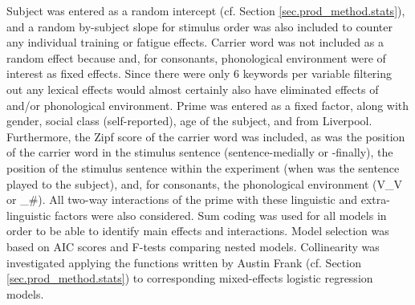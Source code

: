 Subject was entered as a random intercept (cf. Section \ref{sec.prod_method.stats}), and a random by-subject slope for stimulus order was also included to counter any individual training or fatigue effects.
Carrier word was not included as a random effect because  and, for consonants, phonological environment were of interest as fixed effects.
Since there were only 6 keywords per variable filtering out any lexical effects would almost certainly also have eliminated effects of  and/or phonological environment.
Prime was entered as a fixed factor, along with gender, social class (self-reported), age of the subject, and  from Liverpool.
Furthermore, the Zipf score of the carrier word was included, as was the position of the carrier word in the stimulus sentence (sentence-medially or -finally), the position of the stimulus sentence within the experiment (when was the sentence played to the subject), and, for consonants, the phonological environment (V\_V or \_\#).
All two-way interactions of the prime with these linguistic and extra-linguistic factors were also considered.
Sum coding was used for all models in order to be able to identify main effects and interactions.
Model selection was based on AIC scores and F-tests comparing nested models.
Collinearity was investigated applying the functions written by Austin Frank (cf. Section \ref{sec.prod_method.stats}) to corresponding mixed-effects logistic regression models.